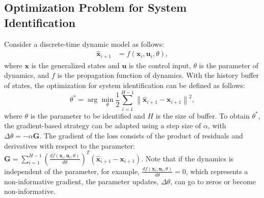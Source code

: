 \subsection{Optimization Problem for System Identification}
Consider a discrete-time dynamic model as follows:
\begin{align}
\label{eq:dynamics}
    \mathbf{\hat{x}}_{i+1} & = f(\mathbf{x}_{i},\mathbf{u}_{i},\theta),
\end{align}
where $\mathbf{x}$ is the generalized states and $\mathbf{u}$ is the control input, $\theta$ is the parameter of dynamics, and $f$ is the propagation function of dynamics. 
With the history buffer of states, the optimization for system identification can be defined as follows\cite{chen2022real}:
\begin{equation}
\label{osi_opt_basic}
     \theta^{*}=\arg\min_{\theta} \frac{1}{2}\sum_{i=1}^{H-1} \left\| {\mathbf{\hat{x}}}_{i+1}-\mathbf{x}_{i+1}\right\|^2,
\end{equation}
where $\theta$ is the parameter to be identified and $H$ is the size of buffer. To obtain $\theta^{*}$, the gradient-based strategy can be adapted using a step size of $\alpha$, with $\Delta{\theta}=-\alpha\mathbf{G}$. The gradient of the loss consists of the product of residuals and derivatives with respect to the parameter: $\mathbf{G}=\sum_{i=1}^{H-1} (\frac{df(\mathbf{x}_i,\mathbf{u}_{i},\theta)}{d\theta})^{T}({\mathbf{\hat{x}}}_{i+1} - \mathbf{x}_{i+1})$. Note that if the dynamics is independent of the parameter, for example, $\frac{df(\mathbf{x}_i,\mathbf{u}_{i},\theta)}{d\theta}=0$, which represents a non-informative gradient, the parameter updates,  $\Delta{\theta}$, can go to zeros or become non-informative.



